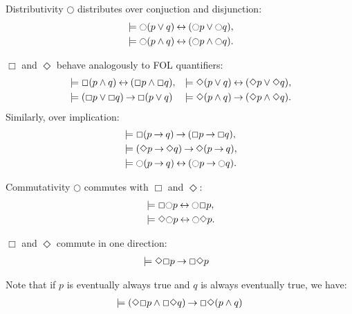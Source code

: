 \documentclass[style=sailor,size=12pt,mode=present]{powerdot}
\theoremstyle{definition}
\newenvironment{thm}[1]
  {\renewcommand\theinnerthm{#1}\innerthm}
  {\endinnerthm}
\begin{document}
\begin{wideslide}[bm=,toc=]{Distributivity}
$\Circle$ distributes over conjuction and disjunction:
\begin{align*}
&\models \Circle (p \lor q) \eqv (\Circle p \lor \Circle q),\\
&\models \Circle (p \land q) \eqv (\Circle p \land \Circle q).
\end{align*}

$\Box$ and $\Diamond$ behave analogously to FOL quantifiers:
\begin{align*}
&\models \Box (p \land q) \mathbin{\leftrightarrow} (\Box p \land \Box q), & \models \Diamond (p \lor q) \mathbin{\leftrightarrow} (\Diamond p \lor \Diamond q), \\
&\models (\Box p \lor \Box q) \mathbin{\rightarrow} \Box (p \lor q) & \models \Diamond (p \land q) \mathbin{\rightarrow} (\Diamond p \land \Diamond q).
\end{align*}
Similarly, over implication:
\begin{align*}
&\models \Box (p \imp q) \imp (\Box p \imp \Box q),\\
&\models (\Diamond p \imp \Diamond q) \imp \Diamond (p \imp q),\\
&\models \Circle (p \imp q) \eqv (\Circle p \imp \Circle q).
\end{align*}
%
\end{wideslide}
\begin{wideslide}[bm=,toc=]{Commutativity}
$\Circle$ commutes with $\Box$ and $\Diamond$: 
\begin{align*}
&\models \Box \Circle p \eqv \Circle \Box p,\\
&\models \Diamond \Circle p \eqv \Circle \Diamond p.
\end{align*}

$\Box$ and $\Diamond$ commute in one direction: 
\begin{align*}
&\models  \Diamond \Box p \mathbin{\rightarrow} \Box \Diamond  p
\end{align*}

Note that if $p$ is eventually always true and $q$ is always eventually
true, we have:
\begin{thm}{13.34}
\begin{align*}
\models (\Diamond \Box p \land \Box \Diamond q) \mathbin{\rightarrow} \Box \Diamond(p \land q)
\end{align*}
\end{thm}


\end{wideslide}
\end{document}
